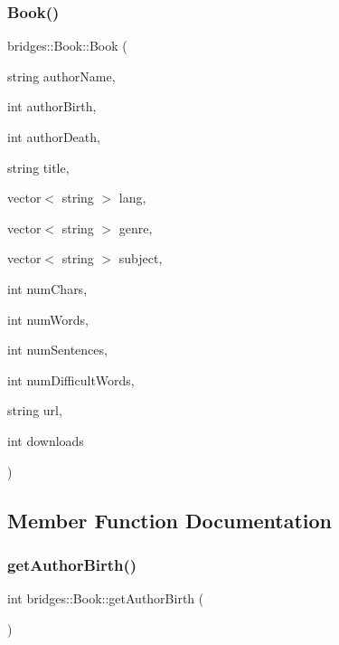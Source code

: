 \subsubsection{\texorpdfstring{Book()}{Book()}\hspace{0.1cm}{\footnotesize\ttfamily [2/2]}}
{\footnotesize\ttfamily bridges\+::\+Book\+::\+Book (\begin{DoxyParamCaption}\item[{string}]{author\+Name,  }\item[{int}]{author\+Birth,  }\item[{int}]{author\+Death,  }\item[{string}]{title,  }\item[{vector$<$ string $>$}]{lang,  }\item[{vector$<$ string $>$}]{genre,  }\item[{vector$<$ string $>$}]{subject,  }\item[{int}]{num\+Chars,  }\item[{int}]{num\+Words,  }\item[{int}]{num\+Sentences,  }\item[{int}]{num\+Difficult\+Words,  }\item[{string}]{url,  }\item[{int}]{downloads }\end{DoxyParamCaption})\hspace{0.3cm}{\ttfamily [inline]}}



\subsection{Member Function Documentation}
\hypertarget{classbridges_1_1_book_aab2b100c668996d17c45817b81323d93}{}\label{classbridges_1_1_book_aab2b100c668996d17c45817b81323d93} 
\subsubsection{\texorpdfstring{get\+Author\+Birth()}{getAuthorBirth()}}
{\footnotesize\ttfamily int bridges\+::\+Book\+::get\+Author\+Birth (\begin{DoxyParamCaption}{ }\end{DoxyParamCaption})\hspace{0.3cm}{\ttfamily [inline]}}

